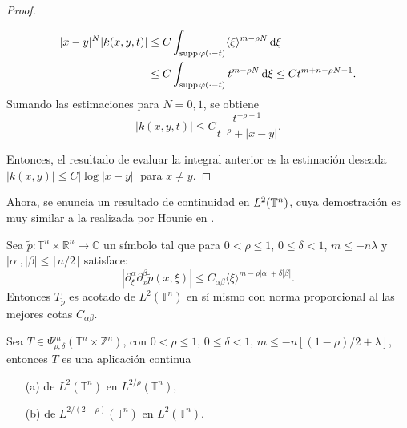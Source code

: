 \begin{proof}
\begin{itemize}
\begin{align*}
			|x-y|^N|k(x, y, t)| \leq & \;C \int_{\operatorname{supp} \varphi(\cdot - t)} \langle\xi\rangle^{m - \rho N} \mathop{}\!\mathrm{d} \xi \\
			\leq & \; C\int_{\operatorname{supp} \varphi(\cdot - t)} t^{m-\rho N}\mathop{}\!\mathrm{d}\xi \leq Ct^{m+n - \rho N-1}.
		\end{align*}
		Sumando las estimaciones para $N = 0, 1$, se obtiene 
		\begin{equation*}
			|k(x, y, t)| \leq C \frac{t^{ -\rho - 1}}{t^{-\rho } + |x - y|}.
		\end{equation*}           
	\end{itemize} Entonces, el resultado de evaluar la integral anterior es la estimación deseada $|k(x, y)| \leq  C|\log |x-y|| $ para $x \neq y$.
\end{proof}
Ahora, se enuncia un resultado de continuidad en $L^2(\mathbb{T}^n)$, cuya demostración es muy similar a la realizada por Hounie en \cite{hounie}.
\begin{theorem}\label{theo:22boundT}
	Sea $\tilde{p}:\mathbb{T}^n \times \mathbb{R}^n \rightarrow \mathbb{C}$ un símbolo tal que para $0<\rho\leq1$, $0\leq \delta < 1$, $m\leq -n \lambda$ y $|\alpha|,|\beta| \leq \lceil n/2\rceil$ satisface: 
	\begin{equation}
		\left|\partial^\alpha_\xi \partial^\beta_x \tilde{p}(x, \xi)\right| \leq C_{\alpha\beta}\langle\xi\rangle^{m-\rho|\alpha| + \delta|\beta|}.
	\end{equation}
	Entonces $T_{\tilde{p}}$ es acotado de $L^2(\mathbb{T}^n)$ en sí mismo con  norma proporcional al las mejores cotas $C_{\alpha\beta}$.
\end{theorem}
\begin{theorem}
	Sea $T \in \Psi^m_{\rho, \delta}(\mathbb{T}^n \times \mathbb{Z}^n) $, con $0 < \rho \leq 1$, $0 \leq \delta < 1$, $m \leq - n [(1-\rho)/2 + \lambda] $, entonces $T$ es una aplicación continua
	\begin{itemize}
		\item[(a)]  de $L^2(\mathbb{T}^n)$ en $L^{2/\rho}(\mathbb{T}^n)$,
		\item[(b)] de $L^{2/(2-\rho)}(\mathbb{T}^n)$ en $L^{2}(\mathbb{T}^n)$.
	\end{itemize}
	\label{teo:cotas-L}
\end{theorem}

